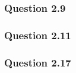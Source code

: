 \documentclass{article}
\begin{document}
\subsubsection{Question 2.9}
\subsubsection{Question 2.11}
\subsubsection{Question 2.17}
\end{document}

